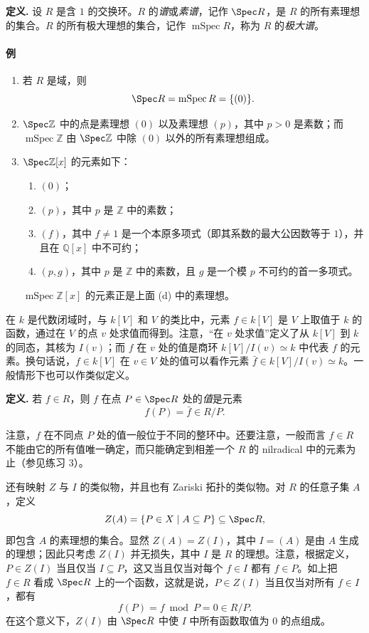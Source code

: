 \noindent\textbf{定义.} 设 $R$ 是含 $1$ 的交换环。$R$ 的\emph{谱}或\emph{素谱}，记作 $\Spec R$，是 $R$ 的所有素理想的集合。$R$ 的所有极大理想的集合，记作 $\operatorname{mSpec}R$，称为 $R$ 的\emph{极大谱}。

\paragraph{例}
\begin{enumerate}[label=(\arabic*)]
	\item 若 $R$ 是域，则
	\[
	\Spec R=\operatorname{mSpec}R=\{(0)\}.
	\]
	
	\item $\Spec\mathbb Z$ 中的点是素理想 $(0)$ 以及素理想 $(p)$，其中 $p>0$ 是素数；而 $\operatorname{mSpec}\mathbb Z$ 由 $\Spec\mathbb Z$ 中除 $(0)$ 以外的所有素理想组成。
	
	\item $\Spec\mathbb Z[x]$ 的元素如下：
	\begin{enumerate}[label=(\alph*)]
		\item $(0)$；
		\item $(p)$，其中 $p$ 是 $\mathbb Z$ 中的素数；
		\item $(f)$，其中 $f\ne1$ 是一个本原多项式（即其系数的最大公因数等于 $1$），并且在 $\mathbb Q[x]$ 中不可约；
		\item $(p,g)$，其中 $p$ 是 $\mathbb Z$ 中的素数，且 $g$ 是一个模 $p$ 不可约的首一多项式。
	\end{enumerate}
	$\operatorname{mSpec}\mathbb Z[x]$ 的元素正是上面 (d) 中的素理想。
\end{enumerate}

在 $k$ 是代数闭域时，与 $k[V]$ 和 $V$ 的类比中，元素 $f\in k[V]$ 是 $V$ 上取值于 $k$ 的函数，通过在 $V$ 的点 $v$ 处求值而得到。注意，“在 $v$ 处求值”定义了从 $k[V]$ 到 $k$ 的同态，其核为 $I(v)$；而 $f$ 在 $v$ 处的值是商环 $k[V]/I(v)\simeq k$ 中代表 $f$ 的元素。换句话说，$f\in k[V]$ 在 $v\in V$ 处的值可以看作元素 $\bar f\in k[V]/I(v)\simeq k$。一般情形下也可以作类似定义。

\noindent\textbf{定义.} 若 $f\in R$，则 $f$ 在点 $P\in\Spec R$ 处的\emph{值}是元素
\[
f(P)=\bar f\in R/P.
\]

注意，$f$ 在不同点 $P$ 处的值一般位于不同的整环中。还要注意，一般而言 $f\in R$ 不能由它的所有值唯一确定，而只能确定到相差一个 $R$ 的 nilradical 中的元素为止（参见练习 3）。

还有映射 $Z$ 与 $I$ 的类似物，并且也有 Zariski 拓扑的类似物。对 $R$ 的任意子集 $A$，定义
\[
Z(A)=\{P\in X\mid A\subseteq P\}\subseteq\Spec R,
\]
即包含 $A$ 的素理想的集合。显然 $Z(A)=Z(I)$，其中 $I=(A)$ 是由 $A$ 生成的理想；因此只考虑 $Z(I)$ 并无损失，其中 $I$ 是 $R$ 的理想。注意，根据定义，$P\in Z(I)$ 当且仅当 $I\subseteq P$，这又当且仅当对每个 $f\in I$ 都有 $f\in P$。如上把 $f\in R$ 看成 $\Spec R$ 上的一个函数，这就是说，$P\in Z(I)$ 当且仅当对所有 $f\in I$，都有
\[
f(P)=f\bmod P=0\in R/P.
\]
在这个意义下，$Z(I)$ 由 $\Spec R$ 中使 $I$ 中所有函数取值为 $0$ 的点组成。

